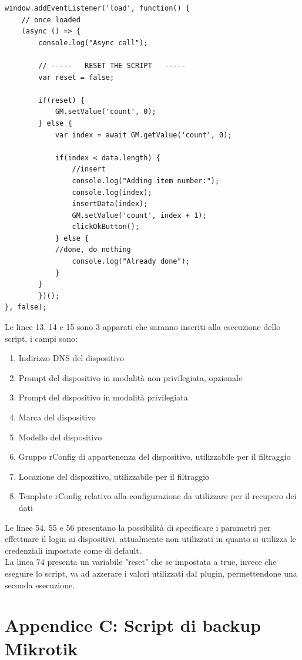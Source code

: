 \documentclass[Tesi.tex]{subfiles}
\begin{document}
\begin{lstlisting}[caption=Script GreaseMonkey di popolamento rConfig]
window.addEventListener('load', function() {
	// once loaded
	(async () => {
		console.log("Async call");
		
		// -----   RESET THE SCRIPT   -----
		var reset = false;
		
		if(reset) {
			GM.setValue('count', 0);
		} else {
			var index = await GM.getValue('count', 0);
			
			if(index < data.length) {
				//insert
				console.log("Adding item number:");
				console.log(index);
				insertData(index);
				GM.setValue('count', index + 1);
				clickOkButton();
			} else {
			//done, do nothing
				console.log("Already done");
			}   
		}
		})();
}, false);

\end{lstlisting}

Le linee 13, 14 e 15 sono 3 apparati che saranno inseriti alla esecuzione dello script, i campi sono:
\begin{enumerate}
	\item Indirizzo DNS del dispositivo
	\item Prompt del dispositivo in modalità non privilegiata, opzionale
	\item Prompt del dispositivo in modalità privilegiata
	\item Marca del dispositivo
	\item Modello del dispositivo
	\item Gruppo rConfig di appartenenza del dispositivo, utilizzabile per il filtraggio
	\item Locazione del dispozitivo, utilizzabile per il filtraggio
	\item Template rConfig relativo alla configurazione da utilizzare per il recupero dei dati
\end{enumerate}

Le linee 54, 55 e 56 presentano la possibilità di specificare i parametri per effettuare il login ai dispositivi, attualmente non utilizzati in quanto si utilizza le credenziali impostate come di default. \\
La linea 74 presenta un variabile "reset" che se impostata a true, invece che eseguire lo script, va ad azzerare i valori utilizzati dal plugin, permettendone una seconda esecuzione.


\label{sec:Appendice C}
\section*{Appendice C: Script di backup Mikrotik}
\end{document}
